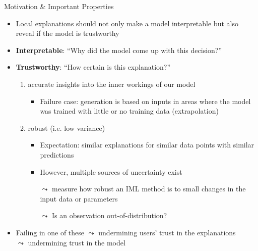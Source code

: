 \documentclass[11pt,compress,t,notes=noshow, aspectratio=169, xcolor=table]{beamer}
\begin{document}
\begin{frame}{Motivation \& Important Properties}
	\begin{itemize}
		\item Local explanations should not only make a model interpretable but also reveal if the model is trustworthy
	    \pause
	    \item \textbf{Interpretable}: ``Why did the model come up with this decision?''
	    \pause
	    \item \textbf{Trustworthy}: ``How certain is this explanation?''
	    \begin{enumerate}
	        \item accurate insights into the inner workings of our model
	        \begin{itemize}
	            \item Failure case: generation is based on inputs in areas where the model was trained with little or no training data (extrapolation)
	        \end{itemize}
	        \pause
	        \item robust (i.e. low variance)
	        \begin{itemize}
	            \item Expectation: similar explanations for similar data points with similar predictions
	            \item However, multiple sources of uncertainty exist
	            \item[$\leadsto$] measure how robust an IML method is to small changes in the input data or parameters
	            \item[$\leadsto$] Is an observation out-of-distribution?
	        \end{itemize}
	    \end{enumerate}
	    \pause
		\item Failing in one of these $\leadsto$ undermining users' trust in the explanations\\ $\leadsto$ undermining trust in the model 
	\end{itemize}
\end{frame}
\end{document}
